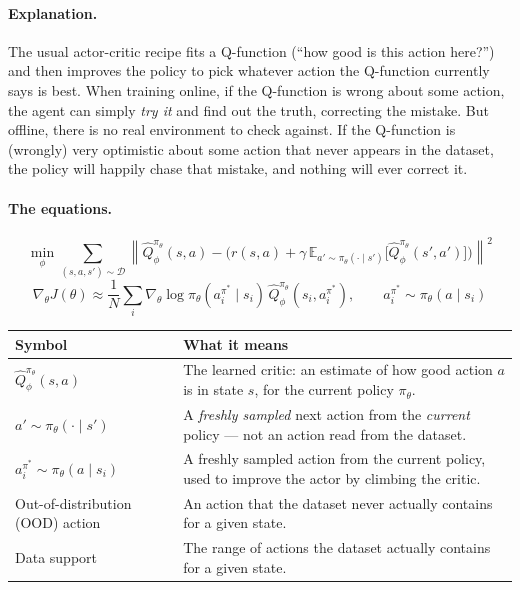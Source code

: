 \documentclass[11pt]{article}
\begin{document}
\paragraph{Explanation.}
The usual actor-critic recipe fits a Q-function (``how good is this action here?'') and
then improves the policy to pick whatever action the Q-function currently says is best.
When training online, if the Q-function is wrong about some action, the agent can simply
\emph{try it} and find out the truth, correcting the mistake. But offline, there is no
real environment to check against. If the Q-function is (wrongly) very optimistic about
some action that never appears in the dataset, the policy will happily chase that
mistake, and nothing will ever correct it.

\paragraph{The equations.}
$$\min_\phi \sum_{(s,a,s')\sim\mathcal{D}} \left\| \hat Q_\phi^{\pi_\theta}(s,a) -
\Big(r(s,a) + \gamma\,\mathbb{E}_{a'\sim\pi_\theta(\cdot\mid s')}\big[\hat Q_\phi^{\pi_\theta}(s',a')\big]\Big)\right\|^2$$
$$\nabla_\theta J(\theta) \approx \frac{1}{N}\sum_i \nabla_\theta \log \pi_\theta(a_i^{\pi^*}\mid s_i)\,
\hat Q_\phi^{\pi_\theta}(s_i, a_i^{\pi^*}), \qquad a_i^{\pi^*}\sim \pi_\theta(a\mid s_i)$$

\begin{center}
\begin{tabular}{@{}p{3.2cm}p{10.3cm}@{}}
\toprule
Symbol & What it means \\
\midrule
$\hat Q_\phi^{\pi_\theta}(s,a)$ & The learned critic: an estimate of how good action $a$
is in state $s$, for the current policy $\pi_\theta$. \\
$a' \sim \pi_\theta(\cdot\mid s')$ & A \emph{freshly sampled} next action from the
\emph{current} policy --- not an action read from the dataset. \\
$a_i^{\pi^*} \sim \pi_\theta(a\mid s_i)$ & A freshly sampled action from the current
policy, used to improve the actor by climbing the critic. \\
Out-of-distribution (OOD) action & An action that the dataset never actually contains
for a given state. \\
Data support & The range of actions the dataset actually contains for a given state. \\
\bottomrule
\end{tabular}
\end{center}
\end{document}
